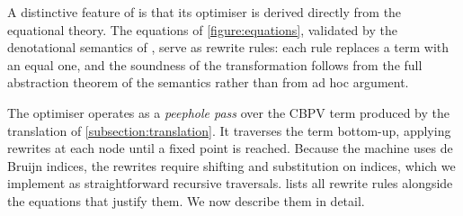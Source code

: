 A distinctive feature of \Gweek{} is that its optimiser is derived directly from
the equational theory. The equations of \cref{figure:equations}, validated by
the denotational semantics of \parencite{jones_2026}, serve as rewrite rules:
each rule replaces a term with an equal one, and the soundness of the
transformation follows from the full abstraction theorem of the semantics rather
than from ad hoc argument.

The optimiser operates as a \emph{peephole pass} over the CBPV term produced by
the translation of \cref{subsection:translation}. It traverses the term
bottom-up, applying rewrites at each node until a fixed point is reached.
Because the machine uses de Bruijn indices, the rewrites require shifting and
substitution on indices, which we implement as straightforward recursive
traversals.  lists all rewrite rules alongside the
equations that justify them. We now describe them in detail.

